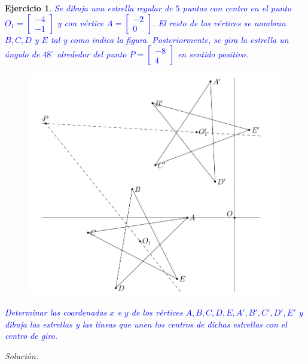 \documentclass{amsart}
\newtheorem{ejer}{Ejercicio}
\begin{document}


\newpage

\begin{ejer}
\textcolor{blue}{Se dibuja una estrella regular de $5$ puntas con centro en el punto $O_1 = \left[ \begin{array}{r} -4 \\ -1 \end{array} \right]$ y con vértice $A = \left[ \begin{array}{r} -2 \\ 0 \end{array} \right]$. El resto de los vértices se nombran $B, C, D$ y $E$ tal y como indica la figura. Posteriormente, se gira la estrella un ángulo de $48^\circ $ alrededor del punto $P = \left[ \begin{array}{r} -8 \\ 4 \end{array} \right]$ en sentido positivo.}

\begin{figure}[H]
\centering
\includegraphics[width = 12cm]{estrella.png}
\end{figure}

\textcolor{blue}{Determinar las coordenadas $x$ e $y$ de los vértices $A,B,C,D,E,A',B',C',D',E'$ y dibuja las estrellas y las líneas que unen los centros de dichas estrellas con el centro de giro.}
\end{ejer}

{\it Solución:}
\end{document}
